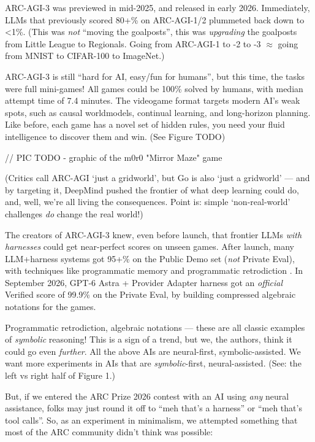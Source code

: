 \documentclass{article}
\begin{document}
ARC-AGI-3 was previewed in mid-2025, and released in early 2026.  \citep{arc_agi_3}  Immediately, LLMs that previously scored 80+\% on ARC-AGI-1/2 plummeted back down to <1\%. (This was \textit{not} ``moving the goalposts'', this was \textit{upgrading} the goalposts from Little League to Regionals. Going from ARC-AGI-1 to -2 to -3 $\approx$ going from MNIST to CIFAR-100 to ImageNet.)

ARC-AGI-3 is still ``hard for AI, easy/fun for humans'', but this time, the tasks were full mini-games! All games could be 100\% solved by humans, with median attempt time of 7.4 minutes. The videogame format targets modern AI's weak spots, such as causal worldmodels, continual learning, and long-horizon planning. Like before, each game has a novel set of hidden rules, you need your fluid intelligence to discover them and win. (See Figure TODO)

// PIC TODO - graphic of the m0r0 "Mirror Maze" game

(Critics call ARC-AGI `just a gridworld', but Go is also `just a gridworld' — and by targeting it, DeepMind pushed the frontier of what deep learning could do, and, well, we're all living the consequences. Point is: simple `non-real-world' challenges \textit{do} change the real world!)

The creators of ARC-AGI-3 knew, even before launch, that frontier LLMs \textit{with harnesses} could get near-perfect scores on unseen games. \citep{arc_agi_3, hill_climbing_arc_3} After launch, many LLM+harness systems got 95+\% on the Public Demo set (\textit{not} Private Eval), with techniques like programmatic memory \citep{prolong_arc_3} and programmatic retrodiction \citep{retrodict_arc_3}. In September 2026, GPT-6 Astra + Provider Adapter harness got an \textit{official} Verified score of 99.9\% on the Private Eval, by building compressed algebraic notations for the games. \citep{astra_arc_3}

Programmatic retrodiction, algebraic notations — these are all classic examples of \textit{symbolic} reasoning! This is a sign of a trend, but we, the authors, think it could go even \textit{further}. All the above AIs are neural-first, symbolic-assisted. We want more experiments in AIs that are \textit{symbolic}-first, neural-assisted. (See: the left vs right half of Figure 1.)

But, if we entered the ARC Prize 2026 contest with an AI using \textit{any} neural assistance, folks may just round it off to ``meh that's a harness'' or ``meh that's tool calls''. So, as an experiment in minimalism, we attempted something that most of the ARC community didn't think was possible:
\end{document}
